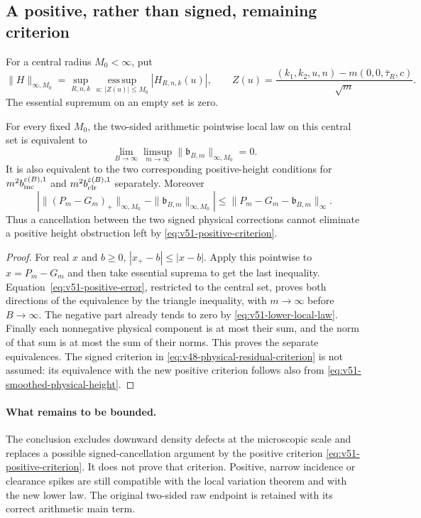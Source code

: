 \subsection{A positive, rather than signed, remaining criterion}
For a central radius $M_0<\infty$, put
\[
 \|H\|_{\infty,M_0}
 =\sup_{R,n,k}\operatorname*{ess\,sup}_{u:\ |Z(u)|\le M_0}|H_{R,n,k}(u)|,
 \qquad
 Z(u)=\frac{(k_1,k_2,u,n)-m(0,0,\bar\tau_R,c)}{\sqrt m}.
\]
The essential supremum on an empty set is zero.

\begin{corollary}
\label{cor:v51-positive-criterion}
For every fixed $M_0$, the two-sided arithmetic pointwise local law
on this central set is equivalent to
\begin{equation}\label{eq:v51-positive-criterion}
 \lim_{B\to\infty}\limsup_{m\to\infty}
         \|\mathfrak b_{B,m}\|_{\infty,M_0}=0.
\end{equation}
It is also equivalent to the two corresponding positive-height
conditions for $m^2b_{\rm inc}^{\varepsilon(B),1}$ and
$m^2b_{\rm clr}^{\varepsilon(B),1}$ separately. Moreover
\[
 \left|\|(P_m-G_m)_+\|_{\infty,M_0}
             -\|\mathfrak b_{B,m}\|_{\infty,M_0}\right|
 \le\|P_m-G_m-\mathfrak b_{B,m}\|_\infty.
\]
Thus a cancellation between the two signed physical corrections
cannot eliminate a positive height obstruction left by
\eqref{eq:v51-positive-criterion}.
\end{corollary}
\begin{proof}
For real $x$ and $b\ge0$, $|x_+-b|\le|x-b|$. Apply this pointwise
to $x=P_m-G_m$ and then take essential suprema to get the last
inequality. Equation~\eqref{eq:v51-positive-error}, restricted to
the central set, proves both directions of the equivalence by the
triangle inequality, with $m\to\infty$ before $B\to\infty$.
The negative part already tends to zero by
\eqref{eq:v51-lower-local-law}. Finally each nonnegative physical
component is at most their sum, and the norm of that sum is at most
the sum of their norms. This proves the separate equivalences.
The signed criterion in \eqref{eq:v48-physical-residual-criterion}
is not assumed: its equivalence with the new positive criterion
follows also from \eqref{eq:v51-smoothed-physical-height}.
\end{proof}

\paragraph{What remains to be bounded.}
The conclusion excludes downward density defects at the microscopic
scale and replaces a possible signed-cancellation argument by the
positive criterion \eqref{eq:v51-positive-criterion}. It does not
prove that criterion. Positive, narrow incidence or clearance spikes
are still compatible with the local variation theorem and with the
new lower law. The original two-sided raw endpoint is retained with
its correct arithmetic main term.
